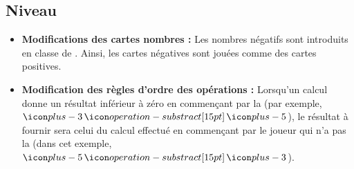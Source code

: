 {    \subsection*{Niveau \hypersetup{urlcolor=gradeColor}}
    \begin{itemize}
        \item \textbf{Modifications des cartes nombres :}
        Les nombres négatifs sont introduits en classe de {\hypersetup{urlcolor=black}}.
        Ainsi, les cartes négatives sont jouées comme des cartes positives.
        \item \textbf{Modification des règles d'ordre des opérations :}
        Lorsqu'un calcul donne un résultat inférieur à zéro en commençant par la \hand
        (par exemple, $\three \minus \five$),
        le résultat à fournir sera celui du calcul effectué en commençant par le joueur qui n'a pas la \hand 
        (dans cet exemple, $\five \minus \three$).
    \end{itemize}
}